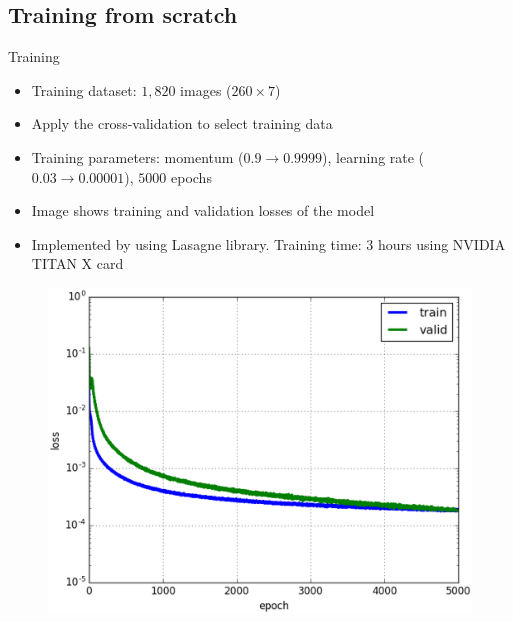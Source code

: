 \documentclass[10pt,svgnames]{beamer}
\begin{document}
\subsection{Training from scratch}
\begin{frame}{Training}{}
	\begin{itemize}
		\item Training dataset: \textbf{$1,820$} images ($260 \times 7$)
		\item Apply the cross-validation to select training data
		\item Training parameters: momentum ($0.9 \rightarrow 0.9999$), learning rate ($0.03 \rightarrow 0.00001$), $5000$ epochs\footnotemark
		\item Image shows training and validation losses of the model
		\item Implemented by using Lasagne library. Training time: 3 hours using NVIDIA TITAN X card
	\end{itemize}
	\begin{center}
     \begin{figure}[htbp]
        \centering
        \includegraphics[scale=.25]{images/loss_model_3}
    	\label{figrsexample1}
	\end{figure}
  \end{center}
	
\end{frame}
\end{document}
